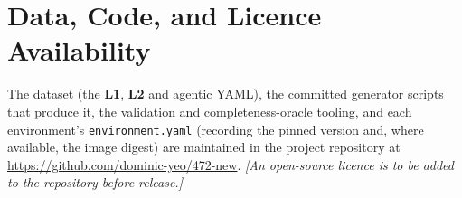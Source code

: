 \documentclass[11pt,a4paper]{article}
\newcommand{\cd}[1]{\lstinline[basicstyle=\ttfamily\small]|#1|}
\renewcommand{\L}[1]{\textbf{L#1}}
\begin{document}
\section*{Data, Code, and Licence Availability}
The dataset (the \L1, \L2 and agentic YAML), the committed generator scripts that produce
it, the validation and completeness-oracle tooling, and each environment's
\cd{environment.yaml} (recording the pinned version and, where available, the image digest)
are maintained in the project repository at
\url{https://github.com/dominic-yeo/472-new}. \emph{[An open-source licence is to be added
to the repository before release.]}

\end{document}
